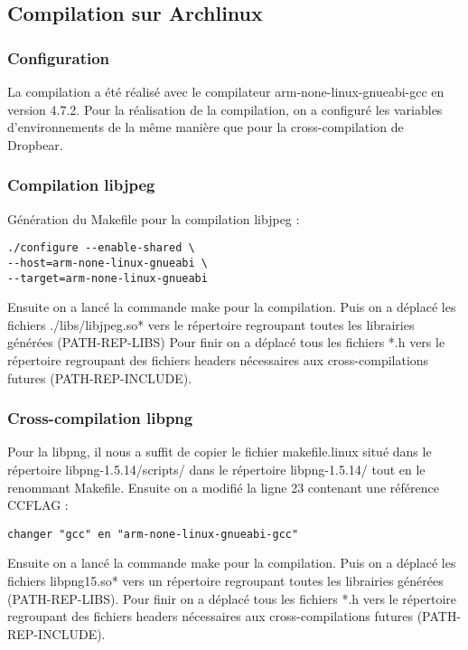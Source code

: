 \newpage

\subsection{Compilation sur Archlinux}

\subsubsection{Configuration}
La compilation a été réalisé avec le compilateur arm-none-linux-gnueabi-gcc en version 4.7.2.
Pour la réalisation de la compilation, on a configuré les variables d'environnements de la même manière que pour la cross-compilation de  Dropbear.


\subsubsection{Compilation libjpeg}
Génération du Makefile pour la compilation libjpeg :

\begin{lstlisting}
./configure --enable-shared \
--host=arm-none-linux-gnueabi \
--target=arm-none-linux-gnueabi
\end{lstlisting}

Ensuite on a lancé la commande make pour la compilation.
Puis on a déplacé les fichiers ./libs/libjpeg.so* vers le répertoire regroupant toutes les librairies générées (PATH-REP-LIBS)
Pour finir on a déplacé tous les fichiers *.h vers le répertoire regroupant des fichiers headers nécessaires aux cross-compilations futures (PATH-REP-INCLUDE).

\subsubsection{Cross-compilation libpng}
Pour la libpng, il nous a suffit de copier le fichier makefile.linux situé dans le répertoire libpng-1.5.14/scripts/ dans le répertoire libpng-1.5.14/ tout en le renommant Makefile. Ensuite on a modifié la ligne 23 contenant une référence CCFLAG : 

\begin{lstlisting}
changer "gcc" en "arm-none-linux-gnueabi-gcc"
\end{lstlisting}

Ensuite on a lancé la commande make pour la compilation.
Puis on a  déplacé les fichiers libpng15.so* vers un répertoire regroupant toutes les librairies générées (PATH-REP-LIBS). 
Pour finir on a déplacé tous les fichiers *.h vers le répertoire regroupant des fichiers headers nécessaires aux cross-compilations futures (PATH-REP-INCLUDE).

